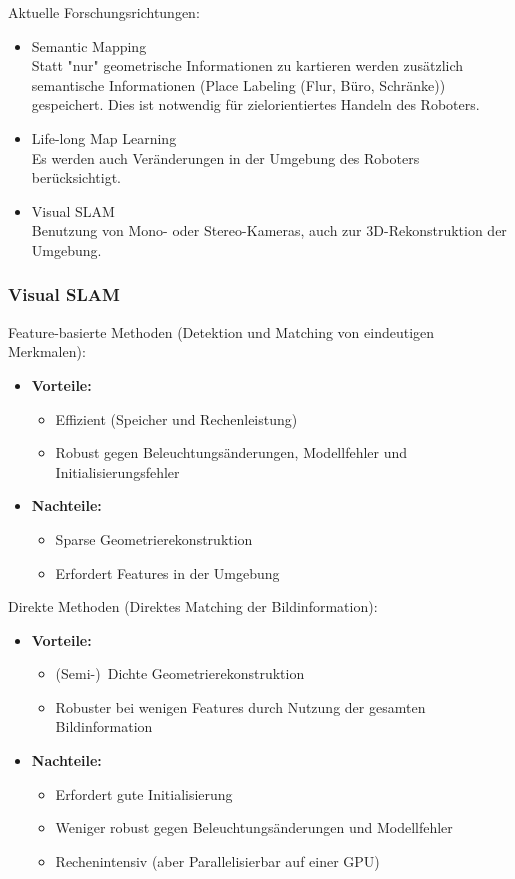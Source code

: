 				Aktuelle Forschungsrichtungen:
				\begin{itemize}
					\item Semantic Mapping \\ Statt "nur" geometrische Informationen zu kartieren werden zusätzlich semantische Informationen (\zB Place Labeling (Flur, Büro, Schränke)) gespeichert. Dies ist notwendig für zielorientiertes Handeln des Roboters.
					\item Life-long Map Learning \\ Es werden auch Veränderungen in der Umgebung des Roboters berücksichtigt.
					\item Visual SLAM \\ Benutzung von Mono- oder Stereo-Kameras, auch zur 3D-Rekonstruktion der Umgebung.
				\end{itemize}

			\subsubsection{Visual SLAM}
				Feature-basierte Methoden (Detektion und Matching von eindeutigen Merkmalen):
				\begin{itemize}
					\item \textbf{Vorteile:}
						\begin{itemize}
							\item Effizient (Speicher und Rechenleistung)
							\item Robust gegen Beleuchtungsänderungen, Modellfehler und Initialisierungsfehler
						\end{itemize}
					\item \textbf{Nachteile:}
						\begin{itemize}
							\item Sparse Geometrierekonstruktion
							\item Erfordert Features in der Umgebung
						\end{itemize}
				\end{itemize}
				
				Direkte Methoden (Direktes Matching der Bildinformation):
				\begin{itemize}
					\item \textbf{Vorteile:}
						\begin{itemize}
							\item (Semi-)~Dichte Geometrierekonstruktion
							\item Robuster bei wenigen Features durch Nutzung der gesamten Bildinformation
						\end{itemize}
					\item \textbf{Nachteile:}
						\begin{itemize}
							\item Erfordert gute Initialisierung
							\item Weniger robust gegen Beleuchtungsänderungen und Modellfehler
							\item Rechenintensiv (aber Parallelisierbar auf einer GPU)
						\end{itemize}
				\end{itemize}

